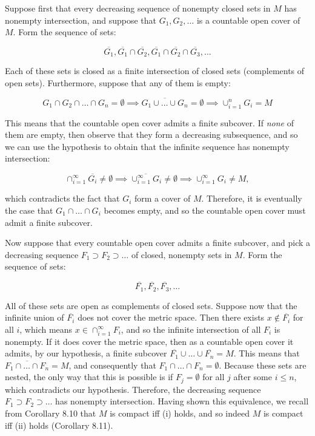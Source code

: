 \begin{solution}
    
    Suppose first that every decreasing sequence of nonempty closed sets in $M$ has nonempty intersection, and suppose that $G_1, G_2, \ldots$ is a countable open cover of $M$.
    Form the sequence of sets:

    \[\overline{G_1}, \overline{G_1} \cap \overline{G_2}, \overline{G_1} \cap \overline{G_2} \cap \overline{G_3}, \ldots\]

    Each of these sets is closed as a finite intersection of closed sets (complements of open sets).
    Furthermore, suppose that any of them is empty:

    \[G_1 \cap G_2 \cap \ldots \cap G_n = \emptyset \implies \overline{G_1 \cup \ldots \cup G_n} = \emptyset \implies \cup_{i=1}^{n} G_i = M\]

    This means that the countable open cover admits a finite subcover.
    If \textit{none} of them are empty, then observe that they form a decreasing subsequence, and so we can use the hypothesis to obtain that the infinite sequence has nonempty intersection:

    \[\cap_{i=1}^{\infty} \overline{G_i} \neq \emptyset \implies \overline{\cup_{i=1}^{\infty} G_i} \neq \emptyset \implies \cup_{i=1}^{\infty}G_i \neq M,\]

    which contradicts the fact that $G_i$ form a cover of $M$.
    Therefore, it is eventually the case that $G_1 \cap \ldots \cap G_i$ becomes empty, and so the countable open cover must admit a finite subcover.

    Now suppose that every countable open cover admits a finite subcover, and pick a decreasing sequence $F_1 \supset F_2 \supset \ldots$ of closed, nonempty sets in $M$.
    Form the sequence of sets:

    \[\overline{F_1}, \overline{F_2}, \overline{F_3}, \ldots\]

    All of these sets are open as complements of closed sets.
    Suppose now that the infinite union of $\overline{F_i}$ does not cover the metric space.
    Then there exists $x \notin \overline{F_i}$ for all $i$, which means $x \in \cap_{i=1}^{\infty} F_i$, and so the infinite intersection of all $F_i$ is nonempty.
    If it does cover the metric space, then as a countable open cover it admits, by our hypothesis, a finite subcover $\overline{F_1} \cup \ldots \cup \overline{F_n} = M$.
    This means that $\overline{F_1 \cap \ldots \cap F_n} = M$, and consequently that $F_1 \cap \ldots \cap F_n = \emptyset$.
    Because these sets are nested, the only way that this is possible is if $F_j = \emptyset$ for all $j$ after some $i \leq n$, which contradicts our hypothesis.
    Therefore, the decreasing sequence $F_1 \supset F_2 \supset \ldots$ has nonempty intersection.
    Having shown this equivalence, we recall from Corollary 8.10 that $M$ is compact iff (i) holds, and so indeed $M$ is compact iff (ii) holds (Corollary 8.11).
\end{solution}

